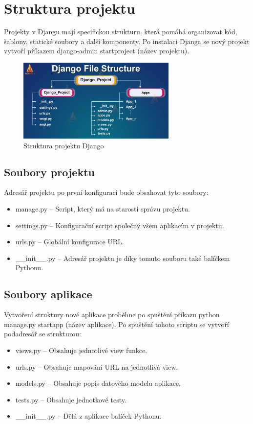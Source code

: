 \documentclass[12pt, a4paper,
twoside,        %
openright
]{report}
\begin{document}
\section{Struktura projektu}
\label{strukturaprojektu}

Projekty v Djangu mají specifickou strukturu, která pomáhá organizovat kód, šablony, statické soubory a další komponenty. Po instalaci Djanga se nový projekt vytvoří příkazem django-admin startproject (název projektu).
	\begin{figure}[h!]
		\centering
		\includegraphics[width=0.7\textwidth]{image/django-struktura.jpg}
		\caption{Struktura projektu Django}
		\label{fig:djangostruktura}
	\end{figure}
\subsection{Soubory projektu}
Adresář projektu po první konfiguraci bude obsahovat tyto soubory:
\begin{itemize}
	\item manage.py – Script, který má na starosti správu projektu.
	\item settings.py – Konfigurační script společný všem aplikacím v projektu.
	\item urls.py – Globální konfigurace URL.
	\item \_\_init\_\_.py – Adresář projektu je díky tomuto souboru také balíčkem Pythonu.
\end{itemize}
\subsection{Soubory aplikace}
Vytvoření struktury nové aplikace proběhne po spuštění příkazu python manage.py startapp (název aplikace). Po spuštění tohoto scriptu se vytvoří podadresář se strukturou:
\begin{itemize}
	\item views.py – Obsahuje jednotlivé view funkce.
	\item urls.py – Obsahuje mapování URL na jednotlivá view.
	\item models.py – Obsahuje popis datového modelu aplikace.
	\item tests.py – Obsahuje jednotkové testy.
	\item \_\_init\_\_.py – Dělá z aplikace balíček Pythonu.
\end{itemize}
\end{document}
